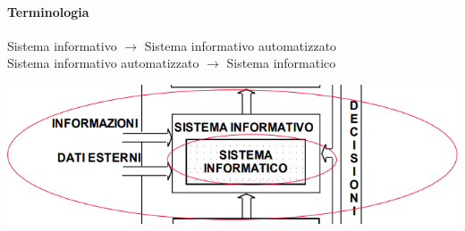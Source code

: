 \documentclass[10pt]{book}
\begin{document}
\paragraph{Terminologia}
\begin{center}
Sistema informativo $\longrightarrow$ Sistema informativo automatizzato\\
Sistema informativo automatizzato $\longrightarrow$ Sistema informatico
\end{center}
\begin{center}
\includegraphics[scale=0.7]{sisinformativoorg2.png}
\end{center}
\pagebreak
\end{document}
